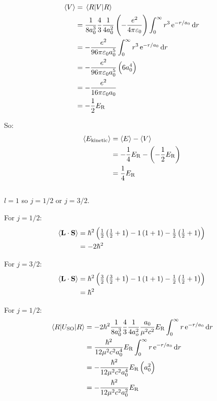 \subsection{}
\begin{align*}
    \expectationvalue{V} & = \expectationvalue{V}{R}\\
    & = \frac{1}{8 a_0^3} \frac{4}{3} \frac{1}{4 a_0^2} \del{- \frac{e^2}{4 \pi \varepsilon_0}} \int_0^{\infty} r^3 \operatorname{e}^{-r/a_0} \dif r\\
    & = - \frac{e^2}{96 \pi \varepsilon_0 a_0^5} \int_0^{\infty} r^3 \operatorname{e}^{-r/a_0} \dif r\\
    & = - \frac{e^2}{96 \pi \varepsilon_0 a_0^5} \del{6 a_0^4}\\
    & = - \frac{e^2}{16 \pi \varepsilon_0 a_0}\\
    & = - \frac{1}{2} E_{\textrm{R}}
\end{align*}

So:
\begin{align*}
    \expectationvalue{E_{\textrm{kinetic}}} & = \expectationvalue{E} - \expectationvalue{V}\\
    & = - \frac{1}{4} E_{\textrm{R}} - \del{- \frac{1}{2} E_{\textrm{R}}}\\
    & = \frac{1}{4} E_{\textrm{R}}
\end{align*}

\subsection{}
$ l = 1 $ so $ j = 1/2 $ or $ j = 3/2 $.

For $ j = 1/2 $:
\begin{align*}
    \expectationvalue{\mathbf{L} \cdot \mathbf{S}} & = \hbar^2 \del{\tfrac{1}{2} \del{\tfrac{1}{2} + 1} - 1\del{1 + 1} - \tfrac{1}{2}\del{\tfrac{1}{2} + 1}}\\
    & = -2\hbar^2
\end{align*}

For $ j = 3/2 $:
\begin{align*}
    \expectationvalue{\mathbf{L} \cdot \mathbf{S}} & = \hbar^2 \del{\tfrac{3}{2} \del{\tfrac{3}{2} + 1} - 1\del{1 + 1} - \tfrac{1}{2}\del{\tfrac{1}{2} + 1}}\\
    & = \hbar^2
\end{align*}

For $ j = 1/2 $:
\begin{align*}
    \expectationvalue{U_{\textrm{SO}}}{R} & = -2\hbar^2 \frac{1}{8 a_0^3} \frac{4}{3} \frac{1}{4 a_o^2} \frac{a_0}{\mu^2 c^2} E_{\textrm{R}} \int_0^{\infty} r \operatorname{e}^{-r/a_0} \dif r\\
    & = \frac{\hbar^2}{12 \mu^2 c^2 a_0^4} E_{\textrm{R}} \int_0^{\infty} r \operatorname{e}^{-r/a_0} \dif r\\
    & = - \frac{\hbar^2}{12 \mu^2 c^2 a_0^4} E_{\textrm{R}} \del{a_0^2}\\
    & = - \frac{\hbar^2}{12 \mu^2 c^2 a_0^2} E_{\textrm{R}}
\end{align*}

